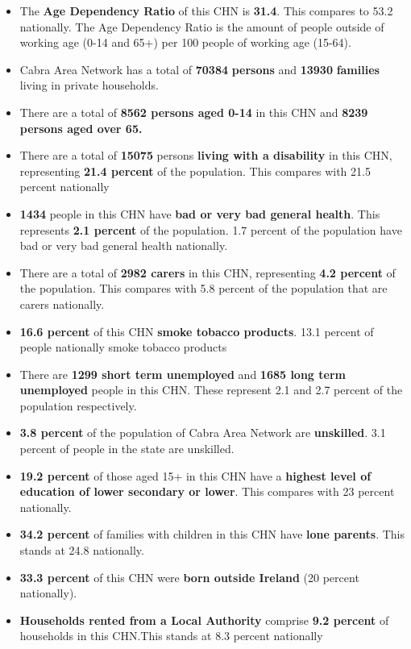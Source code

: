 \documentclass{article}
\begin{document}
\begin{itemize}

\item The \textbf{Age Dependency Ratio} of this CHN is  \textbf{31.4}. This compares to 53.2 nationally. The Age Dependency Ratio is the amount of people outside of working age (0-14 and 65+) per 100 people of working age (15-64). 

\item Cabra Area Network has a total of \textbf{\num{70384}} \textbf{persons} and  \textbf{\num{13930}} \textbf{families} living in private households.

\item There are a total of \textbf{\num{8562} persons aged 0-14} in this CHN and \textbf{\num{8239} persons aged over 65.} 

\item There are a total of \textbf{\num{15075}} persons \textbf{living with a disability} in this CHN, representing \textbf{21.4 percent} of the population. This compares with  21.5 percent nationally

\item \textbf{\num{1434}} people in this CHN have \textbf{bad or very bad general health}. This represents \textbf{2.1 percent} of the population. 1.7 percent of the population have bad or very bad general health nationally. 

\item There are a total of \textbf{\num{2982} carers} in this CHN, representing \textbf{4.2 percent} of the population. This compares with 5.8 percent of the population that are carers nationally. 

\item \textbf{16.6 percent} of this CHN \textbf{smoke tobacco products}. 13.1 percent of people nationally smoke tobacco products

\item There are \textbf{\num{1299} short term unemployed} and \textbf{\num{1685} long term unemployed} people in this CHN. These represent 2.1 and 2.7 percent of the population respectively.

\item  \textbf{3.8 percent} of the population of Cabra Area Network are \textbf{unskilled}. 3.1 percent of people in the state are unskilled.

\item \textbf{19.2 percent} of those aged 15+ in this CHN have a \textbf{highest level of education of lower secondary or lower}. This compares with 23 percent nationally. 

\item \textbf{34.2 percent} of families with children in this CHN have \textbf{lone parents}. This stands at 24.8 nationally.

\item \textbf{33.3 percent} of this CHN were \textbf{born outside Ireland} (20 percent nationally).

\item \textbf{Households rented from a Local Authority} comprise \textbf{9.2 percent} of households in this CHN.This stands at 8.3 percent nationally

\end{itemize}
\end{document}
